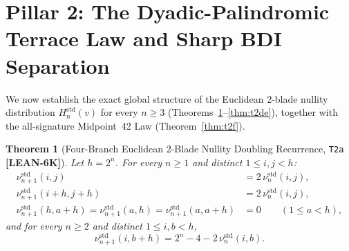 \documentclass[11pt,reqno]{amsart}
\theoremstyle{plain}
\newtheorem{theorem}{Theorem}[section]
\theoremstyle{definition}
\theoremstyle{remark}
\newcommand{\tagLean}{\mbox{\textsf{\textbf{\color{oiBlue}[LEAN-6K]}}}}
\newcommand{\std}{\mathrm{std}}
\begin{document}
\section{Pillar 2: The Dyadic-Palindromic Terrace Law and Sharp BDI Separation}
\label{sec:pillar2}

We now establish the exact global structure of the Euclidean $2$-blade nullity distribution
$H_n^{\std}(v)$ for every $n \ge 3$ (Theorems~\ref{thm:t2a}--\ref{thm:t2de}), together with the
all-signature Midpoint~42 Law (Theorem~\ref{thm:t2f}).

\begin{theorem}[Four-Branch Euclidean 2-Blade Nullity Doubling Recurrence, \texttt{T2a} \tagLean]
\label{thm:t2a}
Let $h = 2^n$. For every $n \ge 1$ and distinct $1 \le i, j < h$:
\begin{align}
  \nu_{n+1}^{\std}(i, j) &= 2\,\nu_n^{\std}(i, j), \label{eq:dbl_lo}\\
  \nu_{n+1}^{\std}(i + h, j + h) &= 2\,\nu_n^{\std}(i, j), \label{eq:dbl_hi}\\
  \nu_{n+1}^{\std}(h, a + h) = \nu_{n+1}^{\std}(a, h) = \nu_{n+1}^{\std}(a, a + h) &= 0
  \qquad (1 \le a < h), \label{eq:dbl_axis}
\end{align}
and for every $n \ge 2$ and distinct $1 \le i, b < h$,
\begin{equation}
\label{eq:dbl_cross}
  \nu_{n+1}^{\std}(i, b + h) = 2^n - 4 - 2\,\nu_n^{\std}(i, b).
\end{equation}
\end{theorem}
\end{document}
